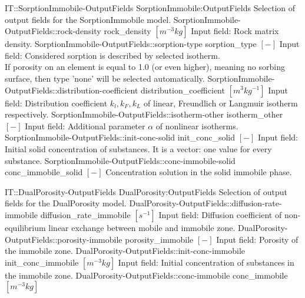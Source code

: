 \begin{SelectionType}
	{IT::SorptionImmobile-OutputFields}
	{SorptionImmobile:OutputFields}
	{{{Selection of output fields for the SorptionImmobile model.}%
}}
		\SelectionItem
			{SorptionImmobile-OutputFields::rock-density}
			{rock{\_}density}
			{{{}{$[m^{-3}kg]$}{ Input field: Rock matrix density.}%
}}
		\SelectionItem
			{SorptionImmobile-OutputFields::sorption-type}
			{sorption{\_}type}
			{{{}{$[-]$}{ Input field: Considered sorption is described by selected isotherm.}\\{
If porosity on an element is equal to 1.0 (or even higher), meaning no sorbing surface, then type 'none' will be selected automatically.}%
}}
		\SelectionItem
			{SorptionImmobile-OutputFields::distribution-coefficient}
			{distribution{\_}coefficient}
			{{{}{$[m^{3}kg^{-1}]$}{ Input field: Distribution coefficient }{ $k_l, k_F, k_L $}{ of linear, Freundlich or Langmuir isotherm respectively.}%
}}
		\SelectionItem
			{SorptionImmobile-OutputFields::isotherm-other}
			{isotherm{\_}other}
			{{{}{$[-]$}{ Input field: Additional parameter }{$ \alpha $}{ of nonlinear isotherms.}%
}}
		\SelectionItem
			{SorptionImmobile-OutputFields::init-conc-solid}
			{init{\_}conc{\_}solid}
			{{{}{$[-]$}{ Input field: Initial solid concentration of substances.
It is a vector: one value for every substance.}%
}}
		\SelectionItem
			{SorptionImmobile-OutputFields::conc-immobile-solid}
			{conc{\_}immobile{\_}solid}
			{{{}{$[-]$}{ Concentration solution in the solid immobile phase.}%
}}
\end{SelectionType}
\begin{SelectionType}
	{IT::DualPorosity-OutputFields}
	{DualPorosity:OutputFields}
	{{{Selection of output fields for the DualPorosity model.}%
}}
		\SelectionItem
			{DualPorosity-OutputFields::diffusion-rate-immobile}
			{diffusion{\_}rate{\_}immobile}
			{{{}{$[s^{-1}]$}{ Input field: Diffusion coefficient of non-equilibrium linear exchange between mobile and immobile zone.}%
}}
		\SelectionItem
			{DualPorosity-OutputFields::porosity-immobile}
			{porosity{\_}immobile}
			{{{}{$[-]$}{ Input field: Porosity of the immobile zone.}%
}}
		\SelectionItem
			{DualPorosity-OutputFields::init-conc-immobile}
			{init{\_}conc{\_}immobile}
			{{{}{$[m^{-3}kg]$}{ Input field: Initial concentration of substances in the immobile zone.}%
}}
		\SelectionItem
			{DualPorosity-OutputFields::conc-immobile}
			{conc{\_}immobile}
			{{{}{$[m^{-3}kg]$}{ }%
}}
\end{SelectionType}
